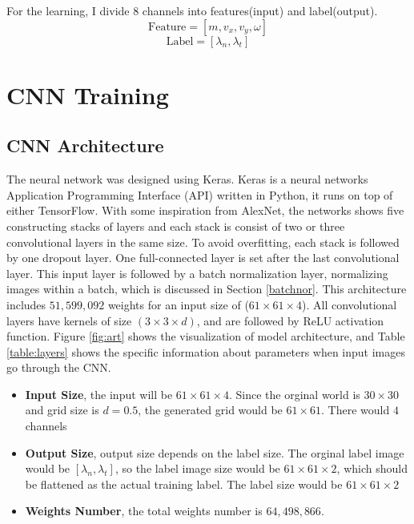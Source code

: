 For the learning, I divide 8 channels into features(input) and label(output).
    $$\text{Feature} = [m, v_x, v_y, \omega]$$
    $$\text{Label} = [\lambda_n, \lambda_t]$$


\section{CNN Training}
\subsection{CNN  Architecture}
    The neural network was designed using Keras\cite{chollet2015keras}. Keras is a neural networks Application Programming Interface (API) written in Python, it runs on top of either TensorFlow. With some inspiration from AlexNet\cite{Krizhevsky:2012:ICD:2999134.2999257}, the networks shows five constructing stacks of layers and each stack is consist of two or three convolutional layers in the same size. To avoid overfitting, each stack is followed by one dropout layer. One full-connected layer is set after the last convolutional layer. This input layer is followed by a batch normalization layer, normalizing images within a batch, which is discussed in Section \ref{batchnor}. This architecture includes $51,599,092$ weights for an input size of ($61\times61\times4$). All convolutional layers have kernels of size $(3\times 3\times d)$, and are followed by ReLU activation function. Figure \ref{fig:art} shows the visualization of model architecture, and Table \ref{table:layers} shows the specific information about parameters when input images go through the CNN.
    \begin{itemize}
        \item \textbf{Input Size}, the input will be $61\times61\times4$. Since the orginal world is $30\times30$ and grid size is $d=0.5$, the generated grid would be $61\times61$. There would $4$ channels
        \item \textbf{Output Size}, output size depends on the label size. The orginal label image would be $[\lambda_n, \lambda_t]$, so the label image size would be $61\times61\times2$, which should be flattened as the actual training label. The label size would be $61\times 61 \times 2$
        \item \textbf{Weights Number}, the total weights number is $64,498,866$. 
    \end{itemize}

